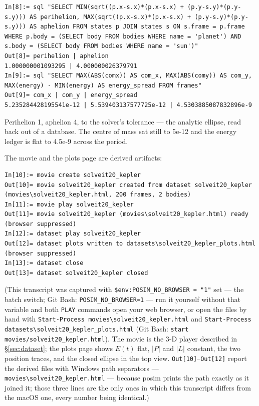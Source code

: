 \documentclass[11pt]{article}
\newcommand{\kw}[1]{\texttt{\uppercase{#1}}}
\newcommand{\code}[1]{\texttt{#1}}
\begin{document}
\begin{lstlisting}
In[8]:= sql "SELECT MIN(sqrt((p.x-s.x)*(p.x-s.x) + (p.y-s.y)*(p.y-s.y))) AS perihelion, MAX(sqrt((p.x-s.x)*(p.x-s.x) + (p.y-s.y)*(p.y-s.y))) AS aphelion FROM states p JOIN states s ON s.frame = p.frame WHERE p.body = (SELECT body FROM bodies WHERE name = 'planet') AND s.body = (SELECT body FROM bodies WHERE name = 'sun')"
Out[8]= perihelion | aphelion
1.000000001093295 | 4.000000026379791
In[9]:= sql "SELECT MAX(ABS(comx)) AS com_x, MAX(ABS(comy)) AS com_y, MAX(energy) - MIN(energy) AS energy_spread FROM frames"
Out[9]= com_x | com_y | energy_spread
5.235284428195541e-12 | 5.539403137577725e-12 | 4.5303885087832896e-9
\end{lstlisting}

Perihelion 1, aphelion 4, to the solver's tolerance --- the analytic
ellipse, read back out of a database. The centre of mass sat still to
5e-12 and the energy ledger is flat to 4.5e-9 across the period.

The movie and the plots page are derived artifacts:

\begin{lstlisting}
In[10]:= movie create solveit20_kepler
Out[10]= movie solveit20_kepler created from dataset solveit20_kepler (movies\solveit20_kepler.html, 200 frames, 2 bodies)
In[11]:= movie play solveit20_kepler
Out[11]= movie solveit20_kepler (movies\solveit20_kepler.html) ready (browser suppressed)
In[12]:= dataset play solveit20_kepler
Out[12]= dataset plots written to datasets\solveit20_kepler_plots.html (browser suppressed)
In[13]:= dataset close
Out[13]= dataset solveit20_kepler closed
\end{lstlisting}

(This transcript was captured with \code{\$env:POSIM\_NO\_BROWSER = "1"}
set --- the batch switch; Git Bash: \code{POSIM\_NO\_BROWSER=1} --- run
it yourself without that variable and both \kw{play} commands open
your web browser, or open the files by hand with
\code{Start-Process movies\textbackslash{}solveit20\_kepler.html} and
\code{Start-Process datasets\textbackslash{}solveit20\_kepler\_plots.html}
(Git Bash: \code{start movies/solveit20\_kepler.html}). The movie is the
3-D player described in \S\ref{sec:dataset}; the plots page shows $E(t)$
flat, $|P|$ and $|L|$ constant, the two position traces, and the closed
ellipse in the top view. \code{Out[10]}--\code{Out[12]} report the
derived files with Windows path separators ---
\code{movies\textbackslash{}solveit20\_kepler.html} --- because posim
prints the path exactly as it joined it; those three lines are the only
ones in which this transcript differs from the macOS one, every number
being identical.)
\end{document}
